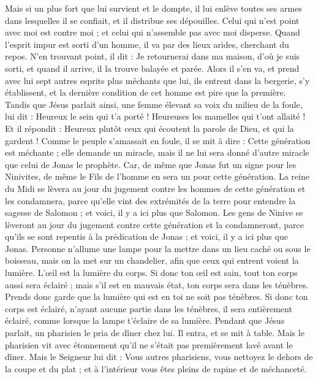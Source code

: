 \begin{multicols}{2}
{Mais si un plus fort que lui survient et le dompte, il lui enlève toutes ses armes dans lesquelles il se confiait, et il distribue ses dépouilles.
Celui qui n'est point avec moi est contre moi ; et celui qui n'assemble pas avec moi disperse.
\TextTitle{[grandeur]}
Quand l'esprit impur est sorti d'un homme, il va par des lieux arides, cherchant du repos. N’en trouvant point, il dit : Je retournerai dans ma maison, d'où je suis sorti,
et quand il arrive, il la trouve balayée et parée.
Alors il s'en va, et prend avec lui sept autres esprits plus méchants que lui, ils entrent dans la bergerie, s’y établissent, et la dernière condition de cet homme est pire que la première.
Tandis que Jésus parlait ainsi, une femme élevant sa voix du milieu de la foule, lui dit : Heureux le sein qui t'a porté ! Heureuses les mamelles qui t’ont allaité !
Et il répondit : Heureux plutôt ceux qui écoutent la parole de Dieu, et qui la gardent !
Comme le peuple s’amassait en foule, il se mit à dire : Cette génération est méchante ; elle demande un miracle, mais il ne lui sera donné d’autre miracle que celui de Jonas le prophète.
Car, de même que Jonas fut un signe pour les Ninivites, de même le Fils de l'homme en sera un pour cette génération.
La reine du Midi se lèvera au jour du jugement contre les hommes de cette génération et les condamnera, parce qu'elle vint des extrémités de la terre pour entendre la sagesse de Salomon ; et voici, il y a ici plus que Salomon.
Les gens de Ninive se lèveront au jour du jugement contre cette génération et la condamneront, parce qu'ils se sont repentis à la prédication de Jonas ; et voici, il y a ici plus que Jonas.
\TextTitle{[grandeur]}
Personne n’allume une lampe pour la mettre dans un lieu caché ou sous le boisseau, mais on la met sur un chandelier, afin que ceux qui entrent voient la lumière.
L’œil est la lumière du corps. Si donc ton œil est sain, tout ton corps aussi sera éclairé ; mais s'il est en mauvais état, ton corps sera dans les ténèbres.
Prends donc garde que la lumière qui est en toi ne soit pas ténèbres.
Si donc ton corps est éclairé, n'ayant aucune partie dans les ténèbres, il sera entièrement éclairé, comme lorsque la lampe t'éclaire de sa lumière.
Pendant que Jésus parlait, un pharisien le pria de dîner chez lui. Il entra, et se mit à table.
Mais le pharisien vit avec étonnement qu'il ne s'était pas premièrement lavé avant le dîner.
\TextTitle{[grandeur]}
Mais le Seigneur lui dit : Vous autres pharisiens, vous nettoyez le dehors de la coupe et du plat ; et à l’intérieur vous êtes pleins de rapine et de méchanceté.
}
\end{multicols}
